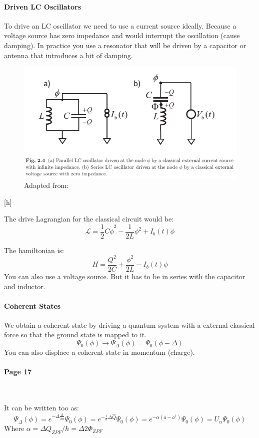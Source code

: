 \documentclass[12pt]{article}
\numberwithin{equation}{subsection}
\newcommand\page[1]{
{
\color{blue}\paragraph{
Page #1
}\mbox{}\\
}
}
\begin{document}
 \paragraph{Driven LC Oscillators\\}
To drive an LC oscillator we need to use a current source ideally. Because a voltage source has zero impedance and would interrupt the oscillation (cause damping). In practice you use a resonator that will be driven by a capacitor or antenna that introduces a bit of damping. 

\begin{figure}[h]
\includegraphics[scale=3]{images/15-driven-lc.png}
\caption{Adapted from: \cite{Girvin2015CircuitQS}}
\end{figure}[h]

The drive Lagrangian for the classical circuit would be:
\begin{equation}
    \mathcal L = \frac{1}{2} C\dot \phi ^2 - \frac{1}{2L} \phi^2+I_b(t)\phi
\end{equation}

The hamiltonian is:
 \begin{equation}
     H = \frac{Q^2}{2C} + \frac{\phi^2}{2L} - I_b(t)\phi
 \end{equation}
 You can also use a voltage source. But it has to be in series with the capacitor and inductor.
 \paragraph{Coherent States\\}
 We obtain a coherent state by driving a quantum system with a external classical force so that the ground state is mapped to it.
 \begin{equation}
     \Psi_0(\phi) \rightarrow \Psi_\Delta (\phi) = \Psi_0(\phi-\Delta)
 \end{equation}
 You can also displace a coherent state in momentum (charge).
 \page{17}
 It can be written too as:
 \begin{equation}
     \Psi_\Delta (\phi) =e^{-\Delta\frac{\partial}{\partial \phi}} \Psi_0 (\phi) = e^{-\frac{i}{\hbar}\Delta\hat Q} \Psi_0 (\phi) = e^{-\alpha (a-a^\dagger)} \Psi_0 (\phi) = U_\alpha \Psi_0 (\phi)
 \end{equation}
 Where $\alpha = \Delta Q_{ZPF}/\hbar = \Delta 2\Phi_{ZPF}$
 
\end{document}
